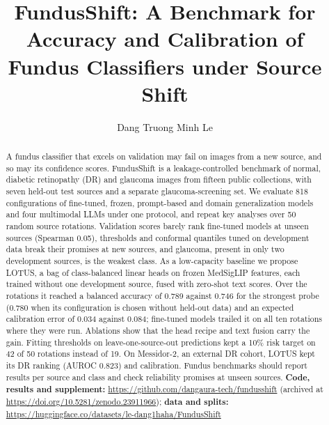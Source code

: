\documentclass[runningheads]{llncs}
\begin{document}
\title{FundusShift: A Benchmark for Accuracy and Calibration of Fundus Classifiers under Source Shift}
\author{Dang Truong Minh Le}
\maketitle

\begin{abstract}
A fundus classifier that excels on validation may fail on images from a new source, and so may its confidence scores. FundusShift is a leakage-controlled benchmark of normal, diabetic retinopathy (DR) and glaucoma images from fifteen public collections, with seven held-out test sources and a separate glaucoma-screening set. We evaluate 818 configurations of fine-tuned, frozen, prompt-based and domain generalization models and four multimodal LLMs under one protocol, and repeat key analyses over 50 random source rotations. Validation scores barely rank fine-tuned models at unseen sources (Spearman 0.05), thresholds and conformal quantiles tuned on development data break their promises at new sources, and glaucoma, present in only two development sources, is the weakest class. As a low-capacity baseline we propose LOTUS, a bag of class-balanced linear heads on frozen MedSigLIP features, each trained without one development source, fused with zero-shot text scores. Over the rotations it reached a balanced accuracy of 0.789 against 0.746 for the strongest probe (0.780 when its configuration is chosen without held-out data) and an expected calibration error of 0.034 against 0.084; fine-tuned models trailed it on all ten rotations where they were run. Ablations show that the head recipe and text fusion carry the gain. Fitting thresholds on leave-one-source-out predictions kept a 10\% risk target on 42 of 50 rotations instead of 19. On Messidor-2, an external DR cohort, LOTUS kept its DR ranking (AUROC 0.823) and calibration. Fundus benchmarks should report results per source and class and check reliability promises at unseen sources.
\noindent\textbf{Code, results and supplement:} \url{https://github.com/dangaura-tech/fundusshift} (archived at \url{https://doi.org/10.5281/zenodo.23911966}); \textbf{data and splits:} \url{https://huggingface.co/datasets/le-dang1haha/FundusShift}

\end{abstract}
\end{document}
